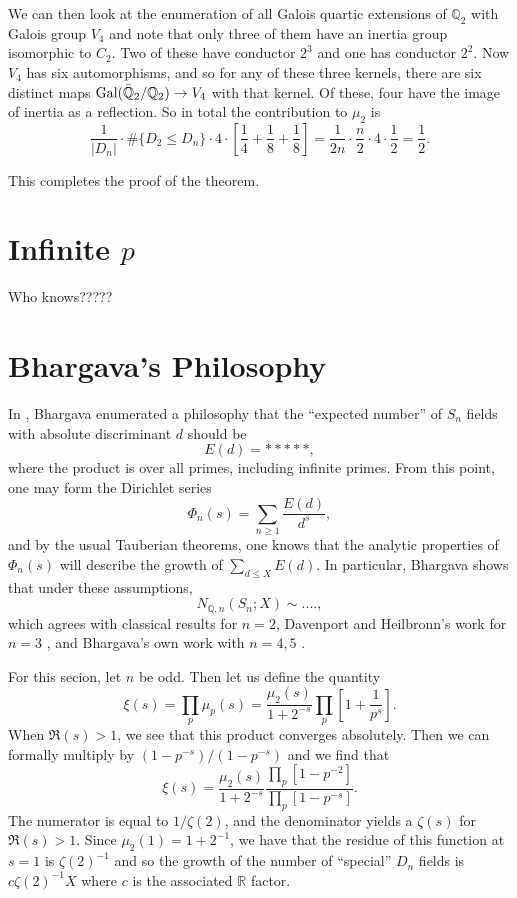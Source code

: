 \documentclass[11pt]{article}
\newcommand{\Gal}{\operatorname{Gal}}
\newcommand{\Qbar}{\Bar{\mathbb{Q}}}
\newcommand{\Q}{\mathbb{Q}}
\newcommand{\R}{\mathbb{R}}
\theoremstyle{definition}
\begin{document}
We can then look at the enumeration of all Galois quartic extensions of $\Q_2$
with Galois group $V_4$ and note that only three of them have an inertia group
isomorphic to $C_2$. Two of these have conductor $2^3$ and one has conductor
$2^2$.  Now $V_4$ has six automorphisms, and so for any of these three kernels,
there are six distinct maps $\Gal(\Qbar_2/\Q_2) \to V_4$ with that kernel. Of
these, four have the image of inertia as a reflection. So in total the
contribution to $\mu_2$ is
\[ \frac{1}{|D_n|} \cdot \#\{ D_2 \leq D_n \} \cdot 4 \cdot \left[\frac{1}{4} + \frac{1}{8} + \frac{1}{8} \right]
  = \frac{1}{2n} \cdot \frac{n}{2} \cdot 4 \cdot \frac{1}{2}
  = \frac{1}{2}. \]

This completes the proof of the theorem.


\section{Infinite $p$}

Who knows?????


\section{Bhargava's Philosophy}

In \cite{bhargavamass}, Bhargava enumerated a philosophy that the ``expected number'' of $S_n$ fields with absolute discriminant $d$ should be
\begin{equation}\label{eqn:ed}
  E(d) = *****,
\end{equation}
where the product is over all primes, including infinite primes.
From this point, one may form the Dirichlet series
\[ \Phi_n(s) = \sum_{n \geq 1} \frac{E(d)}{d^s}, \]
and by the usual Tauberian theorems, one knows that the analytic properties of $\Phi_n(s)$ will describe the growth of $\sum_{d \leq X} E(d)$. In particular, Bhargava shows that under these assumptions,
\[ N_{\Q, n}(S_n; X) \sim ...., \]
which agrees with classical results for $n = 2$, Davenport and Heilbronn's work for $n = 3$ \cite{DH}, and Bhargava's own work with $n = 4, 5$ \cite{BhargavaQuartic, BhargavaQuintic}.

For this secion, let $n$ be odd. Then let us define the quantity
\[ \xi(s) = \prod_p \mu_p(s) = \frac{\mu_2(s)}{1 + 2^{-s}} \prod_{p}\left[ 1 + \frac{1}{p^s} \right]. \]
When $\Re(s) > 1$, we see that this product converges absolutely. Then we can formally multiply by $(1 - p^{-s})/(1 - p^{-s})$ and we find that
\[ \xi(s) = \frac{\mu_2(s)}{1 + 2^{-s}} \frac{\prod_p \left[1 - p^{-2}\right]}{\prod_p \left[1 - p^{-s}\right]}. \]
The numerator is equal to $1/\zeta(2)$, and the denominator yields a $\zeta(s)$ for $\Re(s) > 1$. Since $\mu_2(1) = 1 + 2^{-1}$, we have that the residue of this function at $s = 1$ is $\zeta(2)^{-1}$ and so the growth of the number of ``special'' $D_n$ fields is $c\zeta(2)^{-1}X$ where $c$ is the associated $\R$ factor.
\end{document}
